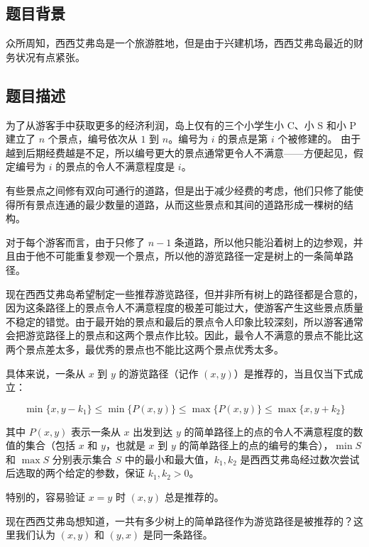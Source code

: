 \subsection*{题目背景}

众所周知，西西艾弗岛是一个旅游胜地，但是由于兴建机场，西西艾弗岛最近的财务状况有点紧张。

\subsection*{题目描述}

为了从游客手中获取更多的经济利润，岛上仅有的三个小学生小 C、小 S 和小 P 建立了 $n$ 个景点，编号依次从 $1$ 到 $n$。编号为 $i$ 的景点是第 $i$ 个被修建的。
由于越到后期经费越是不足，所以编号更大的景点通常更令人不满意——方便起见，假定编号为 $i$ 的景点的令人不满意程度是 $i$。

有些景点之间修有双向可通行的道路，但是出于减少经费的考虑，他们只修了能使得所有景点连通的最少数量的道路，从而这些景点和其间的道路形成一棵树的结构。

对于每个游客而言，由于只修了 $n-1$ 条道路，所以他只能沿着树上的边参观，并且由于他不可能重复参观一个景点，所以他的游览路径一定是树上的一条简单路径。

现在西西艾弗岛希望制定一些推荐游览路径，但并非所有树上的路径都是合意的，因为这条路径上的景点令人不满意程度的极差可能过大，使游客产生这些景点质量不稳定的错觉。由于最开始的景点和最后的景点令人印象比较深刻，所以游客通常会把游览路径上的景点和这两个景点作比较。因此，最令人不满意的景点不能比这两个景点差太多，最优秀的景点也不能比这两个景点优秀太多。

具体来说，一条从 $x$ 到 $y$ 的游览路径（记作 $(x,y)$）是推荐的，当且仅当下式成立：

\begin{equation*}
    \min\lbrace x,y-k_1\rbrace \le \min\lbrace{P(x,y)}\rbrace \le \max\lbrace{P(x,y)}\rbrace \le \max\lbrace{x,y+k_2}\rbrace
\end{equation*}

其中 $P(x,y)$ 表示一条从 $x$ 出发到达 $y$ 的简单路径上的点的令人不满意程度的数值的集合（包括 $x$ 和 $y$，也就是 $x$ 到 $y$ 的简单路径上的点的编号的集合），$\min S$ 和 $\max S$ 分别表示集合 $S$ 中的最小和最大值，$k_1,k_2$ 是西西艾弗岛经过数次尝试后选取的两个给定的参数，保证 $k_1,k_2>0$。

特别的，容易验证 $x=y$ 时 $(x,y)$ 总是推荐的。

现在西西艾弗岛想知道，一共有多少树上的简单路径作为游览路径是被推荐的？这里我们认为 $(x,y)$ 和 $(y,x)$ 是同一条路径。

